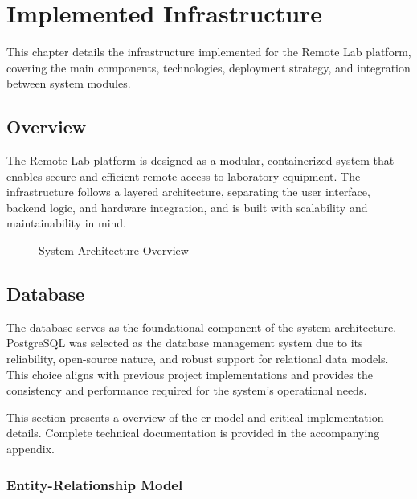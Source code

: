 %
%
\chapter{Implemented Infrastructure} \label{cap:implemented-infrastructure}

This chapter details the infrastructure implemented for the Remote Lab platform, covering the main components, technologies, deployment strategy, and integration between system modules.

\section{Overview}

The Remote Lab platform is designed as a modular, containerized system that enables secure and efficient remote access to laboratory equipment. The infrastructure follows a layered architecture, separating the user interface, backend logic, and hardware integration, and is built with scalability and maintainability in mind.

\begin{figure}[h]
    \begin{center}
        \resizebox{16cm}{!}{}
    \end{center}
    \caption{System Architecture Overview}
    \label{fig:system-architecture}
\end{figure}





\section{Database}
The database serves as the foundational component of the system architecture. PostgreSQL was selected as the database management system due to its reliability, open-source nature, and robust support for relational data models. This choice aligns with previous project implementations and provides the consistency and performance required for the system's operational needs.

This section presents a overview of the \ac{er model} and critical implementation details. Complete technical documentation is provided in the accompanying appendix.

\subsection{Entity-Relationship Model}

